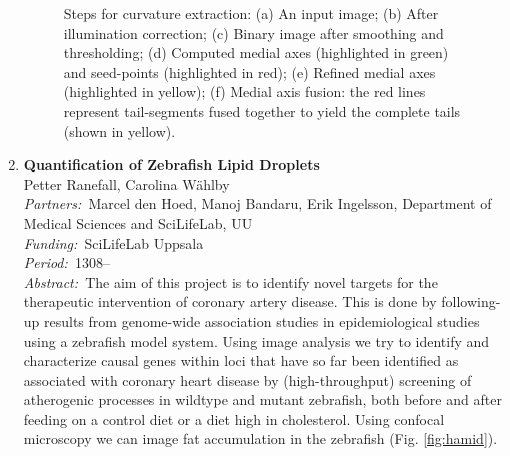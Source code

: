 \documentclass[10pt, a4paper]{article}
\newcommand{\aabstract}[1]{\emph{Abstract:~}#1}
\newcommand{\ffunding}[1]{\emph{Funding:~}#1\\}
\newcommand{\ppartners}[1]{\emph{Partners:~}#1\\}
\newcommand{\pperiod}[1]{\emph{Period:~}#1\\}
\begin{document}
\begin{enumerate}
\begin{figure}[!htbp]
\caption{Steps for curvature extraction: (a) An input image; (b) After illumination correction; (c) Binary image after smoothing and thresholding; (d) Computed medial axes (highlighted in green) and seed-points (highlighted in red); (e) Refined medial axes (highlighted in yellow); (f) Medial axis fusion: the red lines represent tail-segments fused together to yield the complete tails (shown in yellow).}
\label{fig::zebrafish_curvature}
\end{figure}


\item 
\textbf{Quantification of Zebrafish Lipid Droplets}\\
Petter Ranefall, Carolina W\"{a}hlby\\
\ppartners{Marcel den Hoed, Manoj Bandaru, Erik Ingelsson, Department of Medical Sciences and SciLifeLab, UU}
\ffunding{SciLifeLab Uppsala}
\pperiod{1308--}
\aabstract{The aim of this project is to identify novel targets for the therapeutic intervention of coronary artery disease. This is done by following-up results from genome-wide association studies in epidemiological studies using a zebrafish model system.  Using image analysis we try to identify and characterize causal genes within loci that have so far been identified as associated with coronary heart disease by (high-throughput) screening of atherogenic processes in wildtype and mutant zebrafish, both before and after feeding on a control diet or a diet high in cholesterol. Using confocal microscopy we can image fat accumulation in the zebrafish (Fig. \ref{fig:hamid}).}


\end{enumerate}
\end{document}
